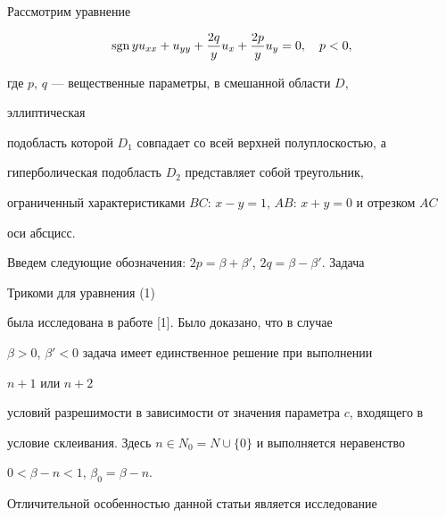  




\maketitle 


\label{begin} 


 


 


 


Рассмотрим уравнение 


\begin{equation} 


\sgn yu_{xx}+u_{yy}+\frac{2q}{y}u_x+\frac{2p}{y}u_y=0,\quad 


p<0, 


\end{equation} 


где $p$, $q$ --- вещественные параметры, в смешанной области $D$, 


эллиптическая 


подобласть которой $D_1$ совпадает со всей верхней полуплоскостью, а 


гиперболическая подобласть $D_2$ представляет собой треугольник, 


ограниченный характеристиками $BC$: $x-y=1$, $AB$: $x+y=0$ и отрезком $AC$ 


оси абсцисс. 


 


Введем следующие обозначения: $2p=\beta+\beta'$, $2q=\beta-\beta'$. Задача 


Трикоми для уравнения (1) 


была исследована в работе [1]. Было доказано, что в случае 


$\beta>0$, $\beta'<0$ задача имеет единственное решение при выполнении 


$n+1$ или $n+2$ 


условий разрешимости в зависимости от значения параметра $c$, входящего в 


условие склеивания. Здесь $n\in N_0=N\cup\{0\}$ и выполняется неравенство 


$0<\beta-n<1$, $\beta_0=\beta-n$. 


 


Отличительной особенностью данной статьи является исследование 


